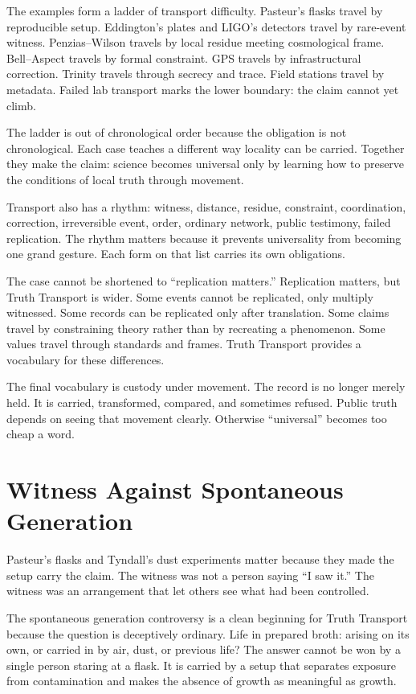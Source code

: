 \begin{chapteressay}
The examples form a ladder of transport difficulty. Pasteur's flasks travel
by reproducible setup. Eddington's plates and LIGO's detectors travel by
rare-event witness. Penzias--Wilson travels by local residue meeting
cosmological frame. Bell--Aspect travels by formal constraint. GPS travels
by infrastructural correction. Trinity travels through secrecy and trace.
Field stations travel by metadata. Failed lab transport marks the lower
boundary: the claim cannot yet climb.

The ladder is out of chronological order because the obligation is not
chronological. Each case teaches a different way locality can be carried.
Together they make the claim: science becomes universal only by learning how
to preserve the conditions of local truth through movement.

Transport also has a rhythm: witness, distance, residue, constraint,
coordination, correction, irreversible event, order, ordinary network, public
testimony, failed replication. The rhythm matters because it prevents
universality from becoming one grand gesture. Each form on that list carries
its own obligations.

The case cannot be shortened to ``replication matters.'' Replication matters,
but Truth Transport is wider. Some events cannot be replicated, only multiply
witnessed. Some records can be replicated only after translation. Some
claims travel by constraining theory rather than by recreating a phenomenon.
Some values travel through standards and frames. Truth Transport provides a
vocabulary for these differences.

The final vocabulary is custody under movement. The record is no longer
merely held. It is carried, transformed, compared, and sometimes refused.
Public truth depends on seeing that movement clearly. Otherwise ``universal''
becomes too cheap a word.
\end{chapteressay}

\section{Witness Against Spontaneous Generation}

Pasteur's flasks and Tyndall's dust experiments matter because they made the
setup carry the claim. The witness was not a person saying ``I saw it.'' The
witness was an arrangement that let others see what had been controlled.

The spontaneous generation controversy is a clean beginning for Truth
Transport because the question is deceptively ordinary. Life in prepared
broth: arising on its own, or carried in by air, dust, or previous life?
The answer cannot be won by a single person staring at a flask. It is
carried by a setup that separates exposure from contamination and makes the
absence of growth as meaningful as growth.

